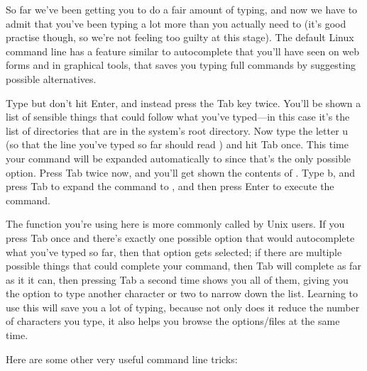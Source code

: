 So far we've been getting you to do a fair amount of typing, and now we have to admit that you've been typing a lot more than you actually need to (it's good practise though, so we're not feeling too guilty at this stage). The default Linux command line has a feature similar to autocomplete that you'll have seen on web forms and in graphical tools, that saves you typing full commands by suggesting possible alternatives. 

Type  but don't hit Enter, and instead press the Tab key twice. You'll be shown a list of sensible things that could follow what you've typed---in this case it's the list of directories that are in the system's root directory. Now type the letter u (so that the line you've typed so far should read ) and hit Tab once. This time your command will be expanded automatically to  since that's the only possible option. Press Tab twice now, and you'll get shown the contents of . Type b, and press Tab to expand the command to , and then press Enter to execute the command.

The  function you're using here is more commonly called  by Unix users. If you press Tab once and there's exactly one possible option that would autocomplete what you've typed so far, then that option gets selected; if there are multiple possible things that could complete your command, then Tab will complete as far as it it can, then pressing Tab a second time shows you all of them, giving you the option to type another character or two to narrow down the list. Learning to use this will save you a lot of typing, because not only does it reduce the number of characters you type, it also helps you browse the options/files at the same time. 



Here are some other very useful command line tricks:

